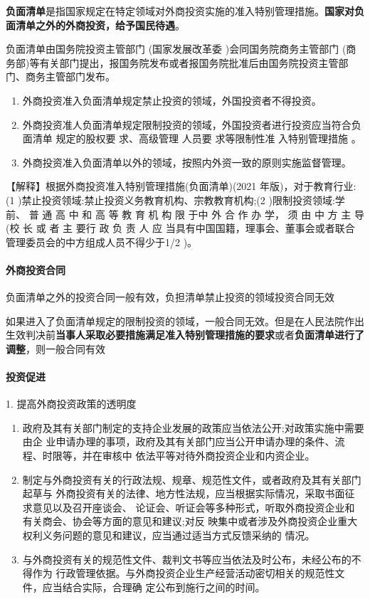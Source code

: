 \documentclass[UTF8,12pt]{ctexart}
\numberwithin{equation}{section} %
\numberwithin{figure}{section}
\numberwithin{table}{section}
\begin{document}
	 \textbf{负面清单}是指国家规定在特定领域对外商投资实施的准入特别管理措施。\textbf{国家对负面清单之外的外商投资，给予国民待遇}。
	 
	 负面清单由国务院投资主管部门 (国家发展改革委 )会同国务院商务主管部门 (商务部)等有关部门提出，报国务院发布或者报国务院批准后由国务院投资主管部门、商务主管部门发布。
	 \begin{enumerate}
	 	\item 外商投资准入负面清单规定禁止投资的领域，外国投资者不得投资。
	 	
	 	\item 外商投资准人负面清单规定限制投资的领域，外国投资者进行投资应当符合负面清单 规定的股权要 求、高级管理 人员要 求等限制性准 入特别管理措施 。
	 	
	 	\item 外商投资准入负面清单以外的领域，按照内外资一致的原则实施监督管理。
	 \end{enumerate}
	
	【解释】根据外商投资准入特别管理措施(负面清单)(2021 年版)，对于教育行业: (1 )禁止投资领域:禁止投资义务教育机构、宗教教育机构;(2 )限制投资领域:学前、 普 通 高 中 和 高 等 教 育 机 构 限 于中 外 合 作 办 学， 须 由 中 方 主 导 (校 长 或 者 主 要行 政 负 责 人 应 当具有中国国籍，理事会、董事会或者联合管理委员会的中方组成人员不得少于1/2 )。
	
	\paragraph{外商投资合同}
	负面清单之外的投资合同一般有效，负担清单禁止投资的领域投资合同无效
	
	如果进入了负面清单规定的限制投资的领域，一般合同无效。但是在人民法院作出生效判决前\textbf{当事人采取必要措施满足准入特别管理措施的要求}或者\textbf{负面清单进行了调整}，则一般合同有效
	
	
	
	\paragraph{投资促进}
	1. 提高外商投资政策的透明度
	\begin{enumerate}
		\item 政府及其有关部门制定的支持企业发展的政策应当依法公开;对政策实施中需要由企 业申请办理的事项，政府及其有关部门应当公开申请办理的条件、流程、时限等，并在审核中 依法平等对待外商投资企业和内资企业。
		
		\item 制定与外商投资有关的行政法规、规章、规范性文件，或者政府及其有关部门起草与 外商投资有关的法律、地方性法规，应当根据实际情况，采取书面征求意见以及召开座谈会、 论证会、听证会等多种形式，听取外商投资企业和有关商会、协会等方面的意见和建议;对反 映集中或者涉及外商投资企业重大权利义务问题的意见和建议，应当通过适当方式反馈采纳的 情况。
		
		\item 与外商投资有关的规范性文件、裁判文书等应当依法及时公布，未经公布的不得作为 行政管理依据。与外商投资企业生产经营活动密切相关的规范性文件，应当结合实际，合理确 定公布到施行之间的时间。
	\end{enumerate}
	
\end{document}
